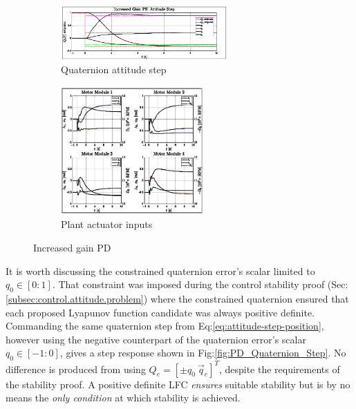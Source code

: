 \begin{figure}[htbp]
\vspace{-10pt}
\centering
\begin{subfigure}{\textwidth}
\centering
\includegraphics[width=0.7\textwidth]{graphs/PD_Diagonal_Gain_Step}
\vspace{-6pt}
\caption{Quaternion attitude step}
\label{fig:PD_Diagonal_Gain_Step}
\end{subfigure}
\begin{subfigure}{\textwidth}
\centering
\includegraphics[width=0.6\textwidth]{graphs/PD_Diagonal_Gain_Input}
\vspace{-8pt}
\caption{Plant actuator inputs}
\label{fig:PD_Diagonal_Gain_Input}
\end{subfigure}
\vspace{-8pt}
\caption{Increased gain PD}
\vspace{-26pt}
\end{figure}
\par
It is worth discussing the constrained quaternion error's scalar limited to $q_0\in[0:1]$. That constraint was imposed during the control stability proof (Sec:\ref{subsec:control.attitude.problem}) where the constrained quaternion ensured that each proposed Lyapunov function candidate was always positive definite. Commanding the same quaternion step from Eq:\ref{eq:attitude-step-position}, however using the negative counterpart of the quaternion error's scalar  $q_0\in[-1:0]$, gives a step response shown in Fig:\ref{fig:PD_Quaternion_Step}. No difference is produced from using $Q_e=[\pm q_0~\vec{q}_e]^T$, despite the requirements of the stability proof. A positive definite LFC \emph{ensures} suitable stability but is by no means the \emph{only condition} at which stability is achieved.
